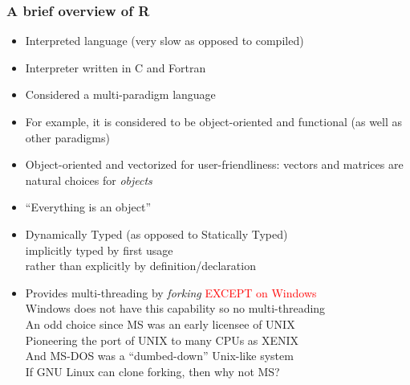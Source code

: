 \documentclass[11pt,pdftex,dvipsnames,usenames,helvetica]{beamer}
\newcommand*{\red}[1]{\textcolor{red}{#1}}
\begin{document}
\begin{frame} 
\frametitle{A brief overview of R}
\begin{itemize}
\item Interpreted language (very slow as opposed to compiled)
\item Interpreter written in C and Fortran
\item Considered a multi-paradigm language
\item For example, it is considered to be object-oriented and
  functional (as well as other paradigms)
\item Object-oriented and vectorized for user-friendliness: vectors
  and matrices are natural choices for {\it objects}
\item ``Everything is an object''
\item Dynamically Typed (as opposed to Statically Typed)\\
implicitly typed by first usage\\
rather than explicitly by definition/declaration 
\item Provides multi-threading by {\it forking} \red{EXCEPT on Windows}\\
Windows does not have this capability so no multi-threading\\
An odd choice since MS was an early licensee of UNIX\\
Pioneering the port of UNIX to many CPUs as XENIX\\
And MS-DOS was a ``dumbed-down'' Unix-like system\\
If GNU Linux can clone forking, then why not MS?
\end{itemize}
\end{frame}
\end{document}
